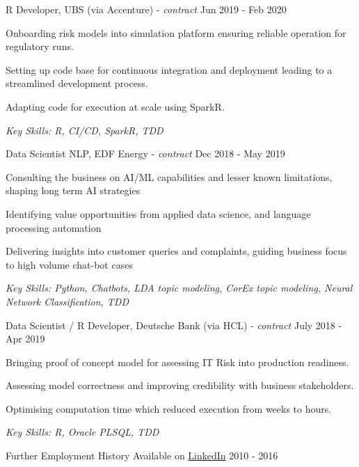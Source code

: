 \documentclass[11pt,article,oneside]{memoir}
\newenvironment{itemize*}{%
  \renewcommand\labelitemi{\textbullet}
  \footnotesize
  \begin{itemize}%
    \setlength{\itemsep}{0pt}}%
  {\end{itemize}
}
\begin{document}
\newpage

\normalsize
\medskip
\ind R Developer, UBS (via Accenture) - \emph{contract} \hfill Jun 2019 - Feb 2020
\begin{itemize*}
    \item Onboarding risk models into simulation platform ensuring reliable operation for regulatory runs.
    \item Setting up code base for continuous integration and deployment leading to a streamlined development process.
    \item Adapting code for execution at scale using SparkR.
\end{itemize*}
\ind \hspace{0.35in} \footnotesize \emph{Key Skills: R, CI/CD, SparkR, TDD}

\normalsize
\medskip
\ind Data Scientist NLP, EDF Energy - \emph{contract} \hfill Dec 2018 - May 2019
\begin{itemize*}
    \item Consulting the business on AI/ML capabilities and lesser known limitations, shaping long term AI strategies
    \item Identifying value opportunities from applied data science, and language processing automation
    \item Delivering insights into customer queries and complaints, guiding business focus to high volume chat-bot cases
\end{itemize*}
\ind \hspace{0.35in} \footnotesize \emph{Key Skills: Python, Chatbots, LDA topic modeling, CorEx topic modeling, Neural Network Classification, TDD }


\normalsize
\medskip
\ind Data Scientist / R Developer, Deutsche Bank (via HCL) - \emph{contract} \hfill July 2018 - Apr 2019
\begin{itemize*}
    \item Bringing proof of concept model for assessing IT Risk into production readiness.
    \item Assessing model correctness and improving credibility with business stakeholders. 
    \item Optimising computation time which reduced execution from weeks to hours.
\end{itemize*}
\ind \hspace{0.35in} \footnotesize \emph{Key Skills: R, Oracle PLSQL, TDD}

\normalsize
\medskip
\ind Further Employment History Available on \href{https://uk.linkedin.com/in/adrian-ionita-6a923129}{LinkedIn} \hfill 2010 - 2016
\end{document}
